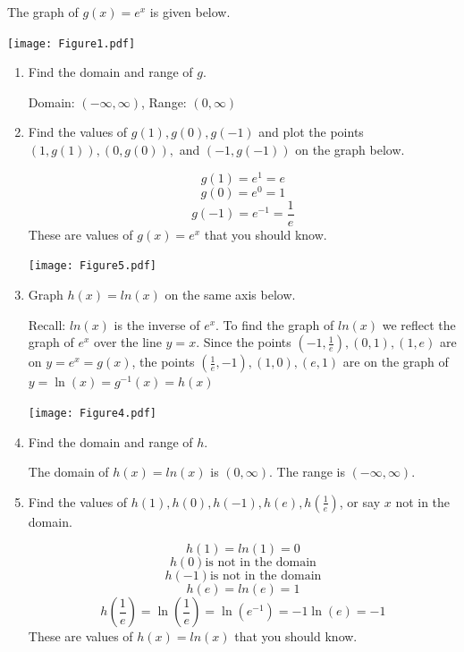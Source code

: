 \documentclass[nooutcomes, noinstructornotes]{ximera}
\begin{document}
\begin{problem}
The graph of $g(x)=e^x$ is given below.

	\begin{image}		
	\texttt{[image: Figure1.pdf]}
	\end{image}

\begin{enumerate}	
	\item  Find the domain and range of $g$.
		\begin{freeResponse}
		Domain: $(-\infty,\infty)$, Range: $(0,\infty)$
		\end{freeResponse}


	
	\item  Find the values of $g(1), g(0), g(-1)$ and plot the points $(1,g(1)), (0,g(0)),$ and $(-1,g(-1))$  on the graph below.
		\begin{freeResponse}
	
			$$g(1)=e^1=e$$
			$$ g(0)=e^0=1$$ 
			$$g(-1)=e^{-1}=\frac{1}{e}$$
			 These are values of $g(x)=e^x$ that you should know.

		\begin{image}		
		\texttt{[image: Figure5.pdf]}
		\end{image}


		\end{freeResponse}
	\item Graph $h(x)=ln(x)$ on the same axis below.
		\begin{freeResponse}
		Recall:  $ln(x)$ is the inverse of $e^x$.  To find the graph of $ln(x)$ we reflect the graph of $e^x$ over the line $y=x$.  Since the points $\left(-1,\frac{1}{e}\right),(0,1),(1,e)$ are on $y=e^x=g(x)$, the points $\left(\frac{1}{e}, -1\right),(1,0),(e,1)$ are on the graph of $y=\ln(x)=g^{-1}(x)=h(x)$ 

		\begin{image}		
		\texttt{[image: Figure4.pdf]}
		\end{image}
		\end{freeResponse}

	\item Find the domain and range of $h$.
		\begin{freeResponse}
		The domain of $h(x)=ln(x)$ is $(0,\infty)$.  The range is $(-\infty,\infty)$.
		\end{freeResponse}

	\item Find the values of $h(1), h(0), h(-1), h(e), h\left(\frac{1}{e}\right)$, or say $x$ not in the domain.
			\begin{freeResponse}
			 $$h(1)=ln(1)=0$$
			$$ h(0) \text{is not in the domain}$$
			$$ h(-1) \text{is not in the domain}$$
			$$h(e)=ln(e)=1$$
			$$h\left(\frac{1}{e}\right)=\ln\left(\frac{1}{e}\right)=\ln\left(e^{-1}\right)= -1\ln(e)=-1$$
			 These are values of $h(x)=ln(x)$ that you should know.
		\end{freeResponse}
	\end{enumerate}
	
 		
		
	
\end{problem}
\end{document}

